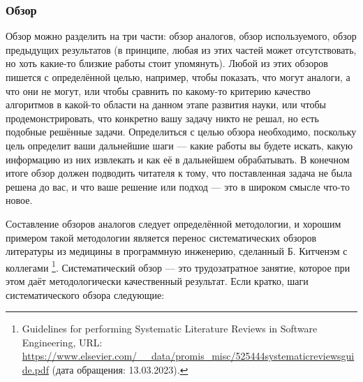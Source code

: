 \documentclass{article}
\begin{document}
\subsubsection{Обзор}

Обзор можно разделить на три части: обзор аналогов, обзор используемого, обзор предыдущих результатов (в принципе, любая из этих частей может отсутствовать, но хоть какие-то близкие работы стоит упомянуть). Любой из этих обзоров пишется с определённой целью, например, чтобы показать, что могут аналоги, а что они не могут, или чтобы сравнить по какому-то критерию качество алгоритмов в какой-то области на данном этапе развития науки, или чтобы продемонстрировать, что конкретно вашу задачу никто не решал, но есть подобные решённые задачи. Определиться с целью обзора необходимо, поскольку цель определит ваши дальнейшие шаги --- какие работы вы будете искать, какую информацию из них извлекать и как её в дальнейшем обрабатывать. В конечном итоге обзор должен подводить читателя к тому, что поставленная задача не была решена до вас, и что ваше решение или подход --- это в широком смысле что-то новое.

Составление обзоров аналогов следует определённой методологии, и хорошим примером такой методологии является перенос систематических обзоров литературы из медицины в программную инженерию, сделанный Б. Китченэм с коллегами \footnote{Guidelines for performing Systematic Literature Reviews in Software Engineering, URL: \url{https://www.elsevier.com/__data/promis_misc/525444systematicreviewsguide.pdf} (дата обращения: 13.03.2023).}. Систематический обзор --- это трудозатратное занятие, которое при этом даёт методологически качественный результат. Если кратко, шаги систематического обзора следующие:
\end{document}
